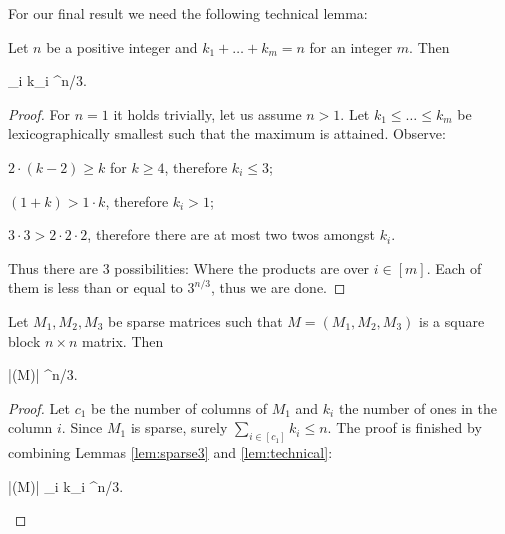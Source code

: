 For our final result we need the following technical lemma:

\begin{lem}
\label{lem:technical}
Let $n$ be a positive integer and $k_1 + \dots + k_m = n$ for an integer $m$. Then
\begin{cosyeqnarray}
	\prod_{i \in [m]} k_i ^{n/3}.
\end{cosyeqnarray}%
\end{lem}
\begin{proof}
For $n=1$ it holds trivially, let us assume $n > 1$. Let $k_1 \leq \dots \leq k_m$ be lexicographically smallest such that the maximum is attained. Observe:
\begin{cosyitemize}
	\item $2 \cdot (k-2) \geq k$ for $k \geq 4$, therefore $k_i \leq 3$;
	\item $(1+k) > 1 \cdot k$, therefore $k_i > 1$;
	\item $3 \cdot 3 > 2 \cdot 2 \cdot 2$, therefore there are at most two twos amongst $k_i$.
\end{cosyitemize}%
Thus there are 3 possibilities:
Where the products are over $i \in [m]$. Each of them is less than or equal to $3^{n/3}$, thus we are done.
\end{proof}

\begin{lem}
\label{lem:3-block-sparse-det}
Let $M_1,M_2,M_3$ be sparse matrices such that $M = (M_1,M_2,M_3)$ is a  square block $n \times n$ matrix. Then
\begin{cosyeqnarray}
 	|\det(M)| ^{n/3}.
\end{cosyeqnarray}%
\end{lem}
\begin{proof}
Let $c_1$ be the number of columns of $M_1$ and $k_i$ the number of ones in the column $i$. Since $M_1$ is sparse, surely $\sum_{i \in [c_1]} k_i \leq n$. The proof is finished by combining Lemmas \ref{lem:sparse3} and \ref{lem:technical}:
\begin{cosyeqnarray}
	|\det(M)| \leq \prod_{i \in [c_1]} k_i ^{n/3}.
\end{cosyeqnarray}%
\end{proof}

